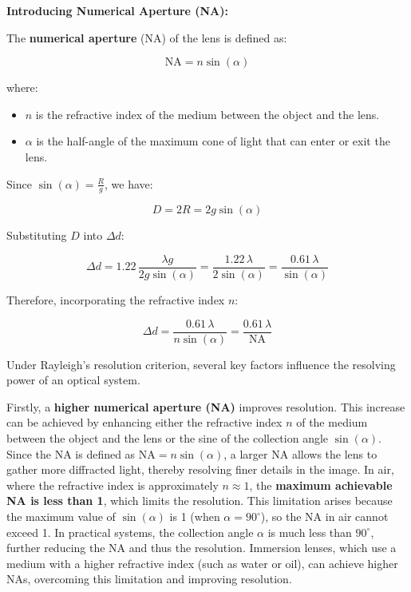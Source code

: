 \documentclass[
  a4paper,
]{book}
\providecommand{\tightlist}{%
  \setlength{\itemsep}{0pt}\setlength{\parskip}{0pt}}
\begin{document}
\textbf{Introducing Numerical Aperture (NA):}

The \textbf{numerical aperture} (NA) of the lens is defined as:

\[
   \text{NA} = n \sin(\alpha)
   \]

where:

\begin{itemize}
\tightlist
\item
  \(n\) is the refractive index of the medium between the object and the
  lens.
\item
  \(\alpha\) is the half-angle of the maximum cone of light that can
  enter or exit the lens.
\end{itemize}

Since \(\sin(\alpha) = \frac{R}{g}\), we have:

\[
   D = 2R = 2 g \sin(\alpha)
   \]

Substituting \(D\) into \(\Delta d\):

\[
   \Delta d = 1.22\, \frac{\lambda g}{2 g \sin(\alpha)} = \frac{1.22\, \lambda}{2 \sin(\alpha)} = \frac{0.61\, \lambda}{\sin(\alpha)}
   \]

Therefore, incorporating the refractive index \(n\):

\[
   \Delta d = \frac{0.61\, \lambda}{n \sin(\alpha)} = \frac{0.61\, \lambda}{\text{NA}}
   \]

Under Rayleigh's resolution criterion, several key factors influence the
resolving power of an optical system.

Firstly, a \textbf{higher numerical aperture (NA)} improves resolution.
This increase can be achieved by enhancing either the refractive index
\(n\) of the medium between the object and the lens or the sine of the
collection angle \(\sin(\alpha)\). Since the NA is defined as
\(\text{NA} = n \sin(\alpha)\), a larger NA allows the lens to gather
more diffracted light, thereby resolving finer details in the image. In
air, where the refractive index is approximately \(n \approx 1\), the
\textbf{maximum achievable NA is less than 1}, which limits the
resolution. This limitation arises because the maximum value of
\(\sin(\alpha)\) is 1 (when \(\alpha = 90^\circ\)), so the NA in air
cannot exceed 1. In practical systems, the collection angle \(\alpha\)
is much less than \(90^\circ\), further reducing the NA and thus the
resolution. Immersion lenses, which use a medium with a higher
refractive index (such as water or oil), can achieve higher NAs,
overcoming this limitation and improving resolution.
\end{document}

